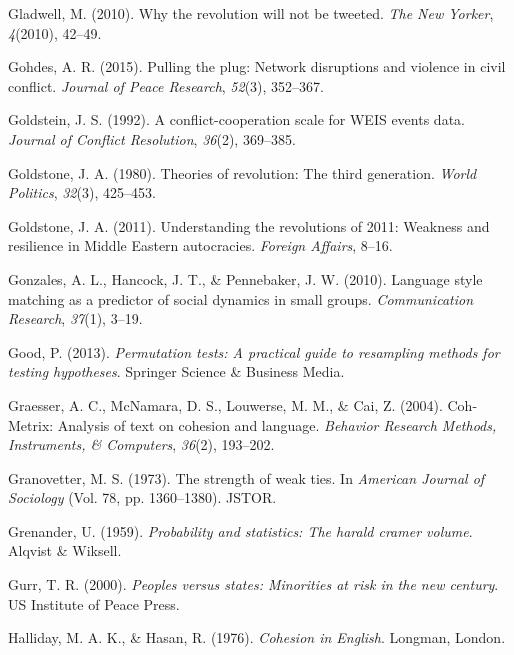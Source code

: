 \documentclass[
  english,
  man]{apa6}
\begin{document}
\leavevmode\hypertarget{ref-gladwell2010revolution}{}%
Gladwell, M. (2010). Why the revolution will not be tweeted. \emph{The New Yorker}, \emph{4}(2010), 42--49.

\leavevmode\hypertarget{ref-gohdes2015pulling}{}%
Gohdes, A. R. (2015). Pulling the plug: Network disruptions and violence in civil conflict. \emph{Journal of Peace Research}, \emph{52}(3), 352--367.

\leavevmode\hypertarget{ref-goldstein1992conflict}{}%
Goldstein, J. S. (1992). A conflict-cooperation scale for WEIS events data. \emph{Journal of Conflict Resolution}, \emph{36}(2), 369--385.

\leavevmode\hypertarget{ref-goldstone1980theories}{}%
Goldstone, J. A. (1980). Theories of revolution: The third generation. \emph{World Politics}, \emph{32}(3), 425--453.

\leavevmode\hypertarget{ref-goldstone2011understanding}{}%
Goldstone, J. A. (2011). Understanding the revolutions of 2011: Weakness and resilience in Middle Eastern autocracies. \emph{Foreign Affairs}, 8--16.

\leavevmode\hypertarget{ref-gonzales2010language}{}%
Gonzales, A. L., Hancock, J. T., \& Pennebaker, J. W. (2010). Language style matching as a predictor of social dynamics in small groups. \emph{Communication Research}, \emph{37}(1), 3--19.

\leavevmode\hypertarget{ref-good2013permutation}{}%
Good, P. (2013). \emph{Permutation tests: A practical guide to resampling methods for testing hypotheses}. Springer Science \& Business Media.

\leavevmode\hypertarget{ref-graesser2004coh}{}%
Graesser, A. C., McNamara, D. S., Louwerse, M. M., \& Cai, Z. (2004). Coh-Metrix: Analysis of text on cohesion and language. \emph{Behavior Research Methods, Instruments, \& Computers}, \emph{36}(2), 193--202.

\leavevmode\hypertarget{ref-granovetter1977strength}{}%
Granovetter, M. S. (1973). The strength of weak ties. In \emph{American Journal of Sociology} (Vol. 78, pp. 1360--1380). JSTOR.

\leavevmode\hypertarget{ref-grenander1959probability}{}%
Grenander, U. (1959). \emph{Probability and statistics: The harald cramer volume}. Alqvist \& Wiksell.

\leavevmode\hypertarget{ref-gurr2000peoples}{}%
Gurr, T. R. (2000). \emph{Peoples versus states: Minorities at risk in the new century}. US Institute of Peace Press.

\leavevmode\hypertarget{ref-halliday1976cohesion}{}%
Halliday, M. A. K., \& Hasan, R. (1976). \emph{Cohesion in English}. Longman, London.
\end{document}
